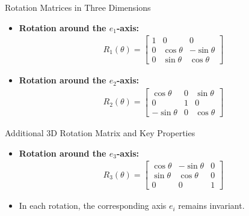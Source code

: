\begin{frame}{Rotation Matrices in Three Dimensions}
    \begin{itemize}
        \item \textbf{Rotation around the $e_1$-axis:}
        \begin{align}
            R_1(\theta) = \begin{bmatrix}
                1 & 0 & 0 \\
                0 & \cos \theta & -\sin \theta \\
                0 & \sin \theta & \cos \theta
            \end{bmatrix}
        \end{align}
        
        \item \textbf{Rotation around the $e_2$-axis:}
        \begin{align}
            R_2(\theta) = \begin{bmatrix}
                \cos \theta & 0 & \sin \theta \\
                0 & 1 & 0 \\
                -\sin \theta & 0 & \cos \theta
            \end{bmatrix}
        \end{align}
    \end{itemize}
\end{frame}

\begin{frame}{Additional 3D Rotation Matrix and Key Properties}
    \begin{itemize}
        \item \textbf{Rotation around the $e_3$-axis:}
        \begin{align}
            R_3(\theta) = \begin{bmatrix}
                \cos \theta & -\sin \theta & 0 \\
                \sin \theta & \cos \theta & 0 \\
                0 & 0 & 1
            \end{bmatrix}
        \end{align}
        
        \item In each rotation, the corresponding axis $e_i$ remains invariant.
    \end{itemize}
\end{frame}

